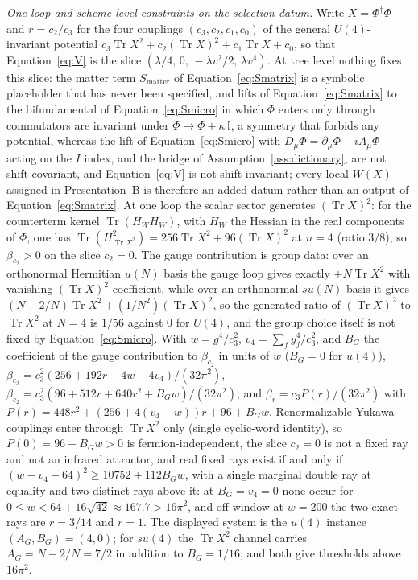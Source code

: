 \emph{One-loop and scheme-level constraints on the selection datum.} Write \(X=\Phi^\dagger\Phi\) and \(r=c_2/c_3\) for the four couplings \((c_3,c_2,c_1,c_0)\) of the general \(U(4)\)-invariant potential \(c_3\operatorname{Tr}X^2+c_2(\operatorname{Tr}X)^2+c_1\operatorname{Tr}X+c_0\), so that Equation~\eqref{eq:V} is the slice \((\lambda/4,\,0,\,-\lambda v^2/2,\,\lambda v^4)\).
At tree level nothing fixes this slice: the matter term \(S_{\mathrm{matter}}\) of Equation~\eqref{eq:Smatrix} is a symbolic placeholder that has never been specified, and lifts of Equation~\eqref{eq:Smatrix} to the bifundamental of Equation~\eqref{eq:Smicro} in which \(\Phi\) enters only through commutators are invariant under \(\Phi\mapsto\Phi+\kappa\,\mathbb I\), a symmetry that forbids any potential, whereas the lift of Equation~\eqref{eq:Smicro} with \(D_\mu\Phi=\partial_\mu\Phi-iA_\mu\Phi\) acting on the \(I\) index, and the bridge of Assumption~\ref{ass:dictionary}, are not shift-covariant, and Equation~\eqref{eq:V} is not shift-invariant; every local \(W(X)\) assigned in Presentation~B is therefore an added datum rather than an output of Equation~\eqref{eq:Smatrix}.
At one loop the scalar sector generates \((\operatorname{Tr}X)^2\): for the counterterm kernel \(\operatorname{Tr}(H_WH_W)\), with \(H_W\) the Hessian in the real components of \(\Phi\), one has \(\operatorname{Tr}(H_{\operatorname{Tr}X^2}^2)=256\operatorname{Tr}X^2+96(\operatorname{Tr}X)^2\) at \(n=4\) (ratio \(3/8\)), so \(\beta_{c_2}>0\) on the slice \(c_2=0\).
The gauge contribution is group data: over an orthonormal Hermitian \(u(N)\) basis the gauge loop gives exactly \(+N\operatorname{Tr}X^2\) with vanishing \((\operatorname{Tr}X)^2\) coefficient, while over an orthonormal \(su(N)\) basis it gives \((N-2/N)\operatorname{Tr}X^2+(1/N^2)(\operatorname{Tr}X)^2\), so the generated ratio of \((\operatorname{Tr}X)^2\) to \(\operatorname{Tr}X^2\) at \(N=4\) is \(1/56\) against \(0\) for \(U(4)\), and the group choice itself is not fixed by Equation~\eqref{eq:Smicro}.
With \(w=g^4/c_3^2\), \(v_4=\sum_f y_f^4/c_3^2\), and \(B_G\) the coefficient of the gauge contribution to \(\beta_{c_2}\) in units of \(w\) (\(B_G=0\) for \(u(4)\)), \(\beta_{c_3}=c_3^2(256+192r+4w-4v_4)/(32\pi^2)\), \(\beta_{c_2}=c_3^2(96+512r+640r^2+B_Gw)/(32\pi^2)\), and \(\beta_r=c_3P(r)/(32\pi^2)\) with \(P(r)=448r^2+(256+4(v_4-w))r+96+B_Gw\).
Renormalizable Yukawa couplings enter through \(\operatorname{Tr}X^2\) only (single cyclic-word identity), so \(P(0)=96+B_Gw>0\) is fermion-independent, the slice \(c_2=0\) is not a fixed ray and not an infrared attractor, and real fixed rays exist if and only if \((w-v_4-64)^2\ge10752+112B_Gw\), with a single marginal double ray at equality and two distinct rays above it: at \(B_G=v_4=0\) none occur for \(0\le w<64+16\sqrt{42}\approx167.7>16\pi^2\), and off-window at \(w=200\) the two exact rays are \(r=3/14\) and \(r=1\). The displayed system is the \(u(4)\) instance \((A_G,B_G)=(4,0)\); for \(su(4)\) the \(\operatorname{Tr}X^2\) channel carries \(A_G=N-2/N=7/2\) in addition to \(B_G=1/16\), and both give thresholds above \(16\pi^2\).
